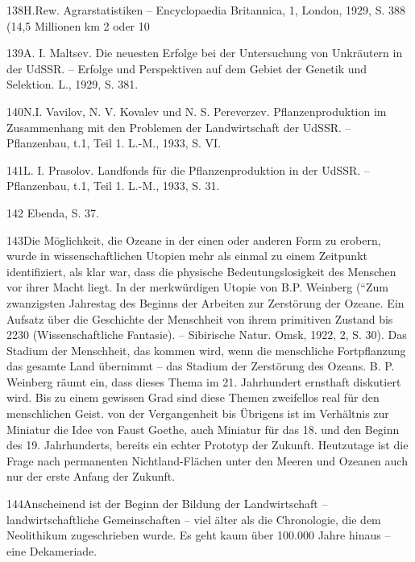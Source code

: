 \documentclass[11pt,a4paper]{book}
\begin{document}
138H.Rew. Agrarstatistiken -- Encyclopaedia Britannica, 1, London, 1929, S. 388 (14,5 Millionen km 2 oder 10%



139A. I. Maltsev. Die neuesten Erfolge bei der Untersuchung von Unkräutern in der UdSSR. -- Erfolge und Perspektiven auf dem Gebiet der Genetik und Selektion. L., 1929, S. 381.



140N.I. Vavilov, N. V. Kovalev und N. S. Pereverzev. Pflanzenproduktion im Zusammenhang mit den Problemen der Landwirtschaft der UdSSR. -- Pflanzenbau, t.1, Teil 1. L.-M., 1933, S. VI.



141L. I. Prasolov. Landfonds für die Pflanzenproduktion in der UdSSR. -- Pflanzenbau, t.1, Teil 1. L.-M., 1933, S. 31.



142 Ebenda, S. 37.



143Die Möglichkeit, die Ozeane in der einen oder anderen Form zu erobern, wurde in wissenschaftlichen Utopien mehr als einmal zu einem Zeitpunkt identifiziert, als klar war, dass die physische Bedeutungslosigkeit des Menschen vor ihrer Macht liegt. In der merkwürdigen Utopie von B.P. Weinberg (“Zum zwanzigsten Jahrestag des Beginns der Arbeiten zur Zerstörung der Ozeane. Ein Aufsatz über die Geschichte der Menschheit von ihrem primitiven Zustand bis 2230 (Wissenschaftliche Fantasie). -- Sibirische Natur. Omsk, 1922, 2, S. 30). Das Stadium der Menschheit, das kommen wird, wenn die menschliche Fortpflanzung das gesamte Land übernimmt -- das Stadium der Zerstörung des Ozeans. B. P. Weinberg räumt ein, dass dieses Thema im 21. Jahrhundert ernsthaft diskutiert wird. Bis zu einem gewissen Grad sind diese Themen zweifellos real für den menschlichen Geist. von der Vergangenheit bis Übrigens ist im Verhältnis zur Miniatur die Idee von Faust Goethe, auch Miniatur für das 18. und den Beginn des 19. Jahrhunderts, bereits ein echter Prototyp der Zukunft. Heutzutage ist die Frage nach permanenten Nichtland-Flächen unter den Meeren und Ozeanen auch nur der erste Anfang der Zukunft.



144Anscheinend ist der Beginn der Bildung der Landwirtschaft -- landwirtschaftliche Gemeinschaften -- viel älter als die Chronologie, die dem Neolithikum zugeschrieben wurde. Es geht kaum über 100.000 Jahre hinaus -- eine Dekameriade.
\end{document}

